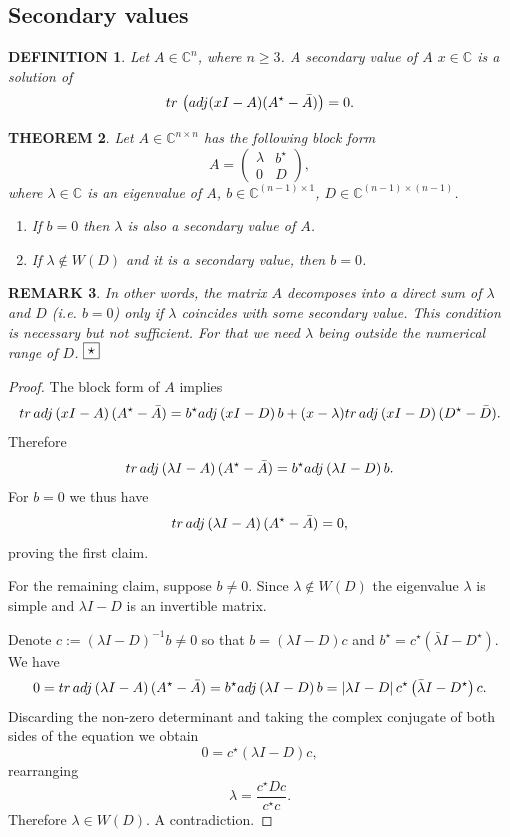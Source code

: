 \documentclass[10pt,a4paper,reqno]{amsart}
\newtheorem{defi}{\bf D\scriptsize EFINITION \normalsize}
\newtheorem{theorem}[defi]{\bf T\scriptsize HEOREM \normalsize}
\newtheorem{rem}[defi]{\bf R\scriptsize EMARK \normalsize}
\def\kopr{\hfill\raisebox{3pt}{\framebox{$\star$}}}
\newenvironment{remark}{\begin{rem}\rm}{$\kopr$\end{rem}}
\newenvironment{definition}{\begin{defi}\rm}{\end{defi}}
\newcommand{\nadsebou}[2]{\begin{array}{c} #1 \\ #2 \end{array}}
\newcommand{\zav}[1]{\left( #1 \right)}
\newcommand{\abs}[1]{\left| #1 \right|}
\newcommand{\tr}{{\rm tr}\,}
\begin{document}
\subsection{Secondary values}
\begin{definition}
Let $A\in\mathbb{C}^n$, where $n\geq 3$. A \textit{secondary value of $A$} $x\in\mathbb{C}$ is a solution of 
\begin{equation}\label{antipoleeq}
\tr \zav{{\rm adj}(xI-A)(A^\star -\bar A)}=0.
\end{equation}
\end{definition}
\begin{theorem}\label{T2}Let $A\in\mathbb{C}^{n\times n}$ has the following block form
$$
A=\zav{\nadsebou{\lambda}{0}\nadsebou{b^\star}{D}},
$$
where $\lambda\in\mathbb{C}$ is an eigenvalue of $A$, $b\in \mathbb{C}^{(n-1)\times 1}$, $D\in\mathbb{C}^{(n-1)\times(n-1)}$.
\begin{enumerate}
\item If $b=0$ then $\lambda$ is also a secondary value of $A$.
\item If $\lambda\not\in W(D)$ and it is a secondary value, then $b=0$.
\end{enumerate}
\end{theorem}
\begin{remark}
In other words, the matrix $A$ decomposes into a direct sum of $\lambda$ and $D$ (i.e. $b=0$) only if $\lambda$ coincides with some secondary value. This condition is necessary but not sufficient. For that we need $\lambda$ being outside the numerical range of $D$. 
\end{remark}
\begin{proof}
The block form of $A$ implies
$$
\tr{\rm adj}\zav{x I-A}(A^\star-\bar A)=b^\star {\rm adj}\zav{x I- D} b+(x-\lambda) \tr{\rm adj}\zav{x I-D}(D^\star-\bar D).
$$
Therefore
$$
\tr{\rm adj}\zav{\lambda I-A}(A^\star-\bar A)=b^\star {\rm adj}\zav{\lambda I- D} b.
$$
For $b=0$ we thus have
$$
\tr{\rm adj}\zav{\lambda I-A}(A^\star-\bar A)=0,
$$
proving the first claim.

For the remaining claim, suppose $b\not=0$. Since $\lambda \not \in W(D)$ the eigenvalue $\lambda$ is simple and $\lambda I-D$ is an invertible matrix.

Denote $c:=(\lambda I-D)^{-1} b\not=0$ so that  $b=(\lambda I-D) c$ and $b^\star=c^\star \zav{\bar \lambda I-D^\star}$. We have
$$
0=\tr {\rm adj}\zav{\lambda I-A}(A^\star-\bar A)=b^\star {\rm adj}\zav{\lambda I- D} b
=\abs{\lambda I-D}c^\star \zav{\bar \lambda I-D^\star} c.
$$  
Discarding the non-zero determinant and taking the complex conjugate of both sides of the equation we obtain
$$
0=c^\star (\lambda I-D) c,
$$
rearranging
$$
\lambda=\frac{c^\star D c}{c^\star c}.
$$
Therefore $\lambda\in W(D)$. A contradiction. 
\end{proof}
\end{document}
